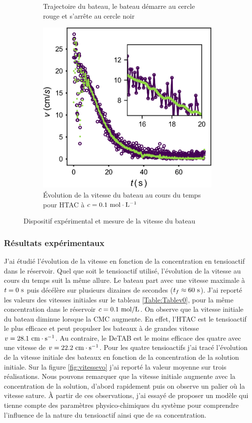\documentclass[french, 10pt]{article}
\begin{document}
\begin{figure}[ht]
\begin{subfigure}[b]{0.45\textwidth}
\caption{Trajectoire du bateau, le bateau démarre au cercle rouge et s'arrête au cercle noir}
\label{fig:trajectoire}
\end{subfigure}\hfill
\begin{subfigure}[b]{0.45\textwidth}
  \centering
  \includegraphics[width=.7\textwidth]{vitesse_t.png}
\caption{Évolution de la vitesse du bateau au cours du temps pour HTAC à $c=0.1~\rm mol\cdot L^{-1}$}
\label{fig:vitesse}
\end{subfigure}\hfill
\caption{Dispositif expérimental et mesure de la vitesse du bateau}
\end{figure}

\subsubsection{Résultats expérimentaux}

J'ai étudié l'évolution de la vitesse en fonction de la concentration en tensioactif dans le réservoir. Quel que soit le tensioactif utilisé, l'évolution de la vitesse au cours du temps suit la même allure. Le bateau part avec une vitesse maximale à $t=0~\rm s$ puis décélère sur plusieurs dizaines de secondes ($t_f\approx 60~\rm s$). J'ai reporté les valeurs des vitesses initiales sur le tableau \ref{Table:Tablev0}, pour la même concentration dans le réservoir $c=0.1~\rm mol/L$. On observe que la vitesse initiale du bateau diminue lorsque la CMC augmente. En effet, l'HTAC est le tensioactif le plus efficace et peut propulser les bateaux à de grandes vitesse $v = 28.1~\rm cm\cdot s^{-1}$. Au contraire, le DeTAB est le moins efficace des quatre avec une vitesse de $v=22.2~\rm cm\cdot s^{-1}$. Pour les quatre tensioactifs j'ai tracé l'évolution de la vitesse initiale des bateaux en fonction de la concentration de la solution initiale. Sur la figure  \ref{fig:vitessevo} j'ai reporté la valeur moyenne sur trois réalisations. Nous pouvons remarquer que la vitesse initiale augmente avec la concentration de la solution, d'abord rapidement puis on observe un palier où la vitesse sature. À partir de ces observations, j'ai essayé de proposer un modèle qui tienne compte des paramètres physico-chimiques du système pour comprendre l'influence de la nature du tensioactif ainsi que de sa concentration.
\end{document}
